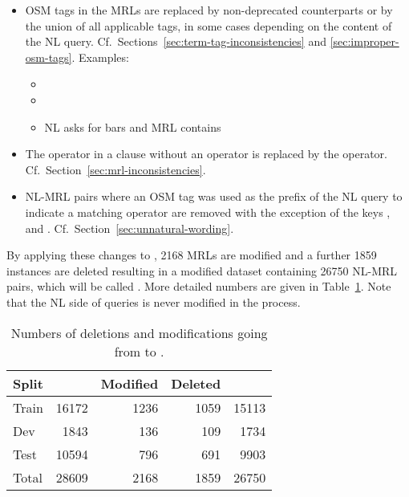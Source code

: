 \begin{itemize}
\item OSM tags in the MRLs are replaced by non-deprecated counterparts or by the
  union of all applicable tags, in some cases depending on the content of the NL
  query. Cf.\ Sections~\ref{sec:term-tag-inconsistencies} and
  \ref{sec:improper-osm-tags}. Examples:
  \begin{itemize}
  \item {} \textrightarrow{} 
  \item {} \textrightarrow{} 
  \item NL asks for bars and MRL contains  \textrightarrow{}
  \end{itemize}

\item The operator  in a  clause without an 
  operator is replaced by the  operator.
  Cf.\ Section~\ref{sec:mrl-inconsistencies}.

\item NL-MRL pairs where an OSM tag was used as the prefix of the NL query to
  indicate a matching  operator are removed with the exception of
  the keys ,  and .
  Cf.\ Section~\ref{sec:unnatural-wording}.
\end{itemize}

By applying these changes to \nlmapstwo{}, \num{2168} MRLs are modified and a
further \num{1859} instances are deleted resulting in a modified dataset
containing \num{26750} NL-MRL pairs, which will be called \nlmapstwoone{}. More
detailed numbers are given in Table~\ref{tab:nlmaps-v2.1-stats}. Note that the
NL side of queries is never modified in the process.

\begin{table}
  \centering
  \begin{tabular}{lrrrr}
    \toprule
    Split & \nlmapstwo{} & Modified & Deleted & \nlmapstwoone{}\\
    \midrule
    Train & \num{16172} & \num{1236} & \num{1059} & \num{15113}\\
    Dev & \num{1843} & \num{136} & \num{109} & \num{1734}\\
    Test & \num{10594} & \num{796} & \num{691} & \num{9903}\\
    \midrule
    Total & \num{28609} & \num{2168} & \num{1859} & \num{26750}\\
    \bottomrule
  \end{tabular}
  \caption[\nlmapstwoone{} statistics]{Numbers of deletions and modifications
    going from \nlmapstwo{} to \nlmapstwoone{}.}
  \label{tab:nlmaps-v2.1-stats}
\end{table}

